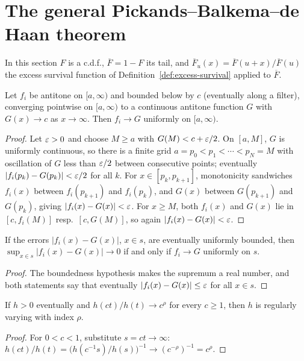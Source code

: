\section{The general Pickands--Balkema--de Haan theorem}

In this section $F$ is a c.d.f., $\overline{F} = 1 - F$ its tail, and
$\overline{F}_u(x) = \overline{F}(u + x)/\overline{F}(u)$ the excess survival function of
Definition~\ref{def:excess-survival} applied to $\overline{F}$.

\begin{lemma}
  \label{lem:polya-uniform}
  \leanok
  Let $f_i$ be antitone on $[a, \infty)$ and bounded below by $c$ (eventually along a filter),
  converging pointwise on $[a, \infty)$ to a continuous antitone function $G$ with
  $G(x) \to c$ as $x \to \infty$. Then $f_i \to G$ uniformly on $[a, \infty)$.
\end{lemma}
\begin{proof}
  \leanok
  Let $\varepsilon > 0$ and choose $M \ge a$ with $G(M) < c + \varepsilon/2$. On $[a, M]$, $G$ is uniformly
  continuous, so there is a finite grid $a = p_0 < p_1 < \cdots < p_N = M$ with oscillation of
  $G$ less than $\varepsilon/2$ between consecutive points; eventually $|f_i(p_k) - G(p_k)| < \varepsilon/2$
  for all $k$. For $x \in [p_k, p_{k+1}]$, monotonicity sandwiches $f_i(x)$ between $f_i(p_{k+1})$
  and $f_i(p_k)$, and $G(x)$ between $G(p_{k+1})$ and $G(p_k)$, giving $|f_i(x) - G(x)| < \varepsilon$.
  For $x \ge M$, both $f_i(x)$ and $G(x)$ lie in $[c, f_i(M)]$ resp.\ $[c, G(M)]$, so again
  $|f_i(x) - G(x)| < \varepsilon$.
\end{proof}

\begin{lemma}
  \label{lem:tendsto-iSup-abs-sub}
  \leanok
  If the errors $|f_i(x) - G(x)|$, $x \in s$, are eventually uniformly bounded, then
  $\sup_{x \in s} |f_i(x) - G(x)| \to 0$ if and only if $f_i \to G$ uniformly on $s$.
\end{lemma}
\begin{proof}
  \leanok
  The boundedness hypothesis makes the supremum a real number, and both statements say that
  eventually $|f_i(x) - G(x)| \le \varepsilon$ for all $x \in s$.
\end{proof}

\begin{lemma}
  \label{lem:rv-of-one-le}
  \leanok
  If $h > 0$ eventually and $h(ct)/h(t) \to c^\rho$ for every $c \ge 1$, then $h$ is regularly
  varying with index $\rho$.
\end{lemma}
\begin{proof}
  \leanok
  For $0 < c < 1$, substitute $s = ct \to \infty$: $h(ct)/h(t) = \big( h(c^{-1} s)/h(s) \big)^{-1}
  \to (c^{-\rho})^{-1} = c^\rho$.
\end{proof}

